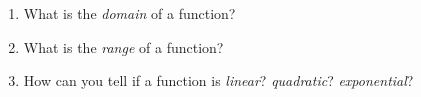 \documentclass[11pt,fleqn]{article}
\begin{document}
\begin{enumerate}
\begin{enumerate}
	
	\item What is the \emph{domain} of a function? \\
	
	
	\item What is the \emph{range} of a function? \\
	
	
	\item How can you tell if a function is \emph{linear}? \emph{quadratic}? \emph{exponential}? \\
	
	\vfill
	\end{enumerate}
\end{enumerate}
\end{document}
